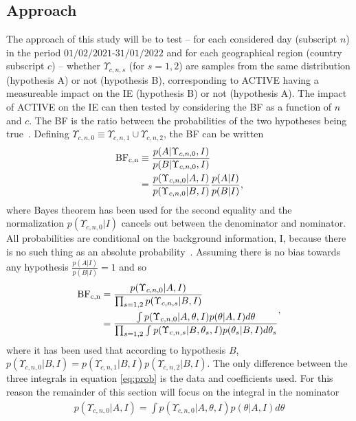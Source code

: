 \documentclass[fleqn,usenatbib,nofootinbib]{revtex4-2}
\begin{document}
	\subsection{Approach}
	\label{sec:approach}
	The approach of this study will be to test -- for each considered day (subscript $n$) in the period $01/02/2021$-$31/01/2022$ and for each geographical region (country subscript $c$) -- whether $\Upsilon_{c,n,s}$ (for $s=1,2$) are samples from the same distribution (hypothesis A) or not (hypothesis B), corresponding to ACTIVE having a measureable impact on the IE (hypothesis B) or not (hypothesis A). The impact of ACTIVE on the IE can then tested by considering the BF as a function of $n$ and $c$. The BF is the ratio between the probabilities of the two hypotheses being true~\citep{Sivia2006,murphy2013}. Defining  $\Upsilon_{c,n,0}\equiv \Upsilon_{c,n,1}\cup \Upsilon_{c,n,2}$, the BF can be written	
	\begin{equation}
		\begin{split}
			\rm BF_{c,n} &\equiv \frac{p(A|\Upsilon_{c,n,0},I)}{p(B|\Upsilon_{c,n,0},I)}\\
			&= \frac{p(\Upsilon_{c,n,0}|A,I)}{p(\Upsilon_{c,n,0}|B,I)}\frac{p(A|I)}{p(B|I)},
		\end{split}
	\end{equation}
	where Bayes theorem has been used for the second equality and the normalization $p(\Upsilon_{c,n,0}|I)$ cancels out between the denominator and nominator. All probabilities are conditional on the background information, I, because there is no such thing as an absolute probability~\citep{Sivia2006}. Assuming there is no bias towards any hypothesis $\frac{p(A|I)}{p(B|I)}=1$ and so
	\begin{equation}
		\begin{split}
			\rm BF_{c,n} &= \frac{p(\Upsilon_{c,n,0}|A,I)}{\prod_{s=1,2}p(\Upsilon_{c,n,s}|B,I)}\\
			&=\frac{\int p(\Upsilon_{c,n,0}|A,\theta,I) p(\theta|A,I) d\theta}{\prod_{s=1,2}\int p(\Upsilon_{c,n,s}|B,\theta_s,I) p(\theta_s|B,I)d\theta_s}
		\end{split},
		\label{eq:prob}
	\end{equation}
	where it has been used that according to hypothesis $B$, $p(\Upsilon_{c,n,0}|B,I) =p(\Upsilon_{c,n,1}|B,I)p(\Upsilon_{c,n,2}|B,I)$. The only difference between the three integrals in equation \eqref{eq:prob} is the data and coefficients used. For this reason the remainder of this section will focus on the integral in the nominator
	\begin{equation}
		\begin{split}
			p(\Upsilon_{c,n,0}|A,I) = \int p(\Upsilon_{c,n,0}|A,\theta,I)p(\theta|A,I)d\theta
		\end{split}
	\end{equation}
\end{document}
